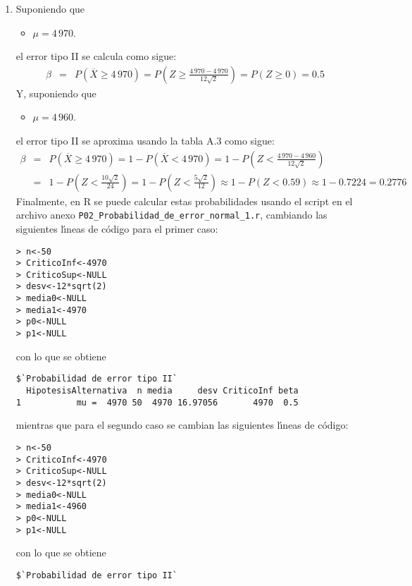 \begin{solucion}
\begin{enumerate}
  \item Suponiendo que
  \begin{itemize}
   \item $\mu = 4\,970$.
  \end{itemize}
  el error tipo II se calcula como sigue:
  \begin{eqnarray*}
   \beta & = & P\left( \overline{X} \geq 4\,970 \right) = P\left( Z \geq \frac{4\,970 - 4\,970}{12\sqrt{2}} \right) = P(Z \geq 0) = 0.5
  \end{eqnarray*}
  Y, suponiendo que
  \begin{itemize}
   \item $\mu = 4\,960$.
  \end{itemize}
  el error tipo II se aproxima usando la tabla A.3 como sigue:
  \begin{eqnarray*}
   \beta & = & P\left( \overline{X} \geq 4\,970 \right) = 1 - P\left( \overline{X} < 4\,970 \right) = 1 - P\left( Z < \frac{4\,970 - 4\,960}{12\sqrt{2}} \right) \\
   & = & 1 - P\left( Z < \frac{10\sqrt{2}}{24} \right) = 1 - P\left( Z < \frac{5\sqrt{2}}{12} \right) \approx 1 - P(Z < 0.59) \approx 1 - 0.7224 = 0.2776
  \end{eqnarray*}
  Finalmente, en R se puede calcular estas probabilidades usando el script en el archivo anexo \texttt{P02\_Probabilidad\_de\_error\_normal\_1.r}, cambiando las siguientes l\'{\i}neas de c\'odigo para el primer caso:
  \begin{verbatim}
> n<-50
> CriticoInf<-4970
> CriticoSup<-NULL
> desv<-12*sqrt(2)
> media0<-NULL
> media1<-4970
> p0<-NULL
> p1<-NULL
  \end{verbatim}
  \vspace{-0.5cm}
  con lo que se obtiene
  \begin{verbatim}
$`Probabilidad de error tipo II`
  HipotesisAlternativa  n media     desv CriticoInf beta
1           mu =  4970 50  4970 16.97056       4970  0.5
  \end{verbatim}
  \vspace{-0.5cm}
  mientras que para el segundo caso se cambian las siguientes l\'{\i}neas de c\'odigo:
  \begin{verbatim}
> n<-50
> CriticoInf<-4970
> CriticoSup<-NULL
> desv<-12*sqrt(2)
> media0<-NULL
> media1<-4960
> p0<-NULL
> p1<-NULL
  \end{verbatim}
  \vspace{-0.5cm}
  con lo que se obtiene
  \begin{verbatim}
$`Probabilidad de error tipo II`

\end{verbatim}
\end{enumerate}
\end{solucion}
